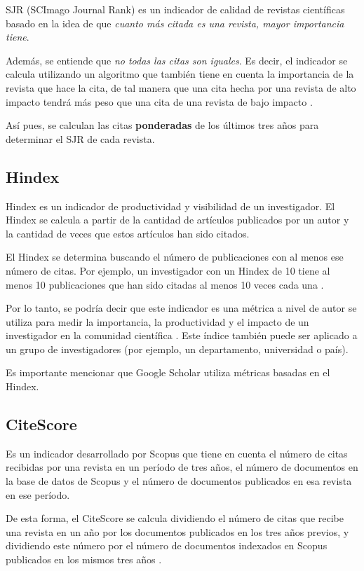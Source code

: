 SJR (SCImago Journal Rank) es un indicador de calidad de revistas científicas basado en la idea de que \textit{cuanto más citada es una revista, mayor importancia tiene}. 

Además, se entiende que \textit{no todas las citas son iguales}\cite{Svetla2022}. Es decir, el indicador se calcula utilizando un algoritmo que también tiene en cuenta la importancia de la revista que hace la cita, de tal manera que una cita hecha por una revista de alto impacto tendrá más peso que una cita de una revista de bajo impacto \cite{Svetla2022}. 

Así pues, se calculan las citas \textbf{ponderadas} de los últimos tres años para determinar el SJR de cada revista.

\subsection{Hindex}
Hindex es un indicador de productividad y visibilidad de un investigador. El Hindex se calcula a partir de la cantidad de artículos publicados por un autor y la cantidad de veces que estos artículos han sido citados. 

El Hindex se determina buscando el número de publicaciones con al menos ese número de citas. Por ejemplo, un investigador con un Hindex de 10 tiene al menos 10 publicaciones que han sido citadas al menos 10 veces cada una \cite{Svetla2022}. 

Por lo tanto, se podría decir que este indicador es una métrica a nivel de autor se utiliza para medir la importancia, la productividad y el impacto de un investigador en la comunidad científica \cite{Svetla2022}. Este índice también puede ser aplicado a un grupo de investigadores (por ejemplo, un departamento, universidad o país).

Es importante mencionar que Google Scholar utiliza métricas basadas en el Hindex.

\subsection{CiteScore}
Es un indicador desarrollado por Scopus que tiene en cuenta el número de citas recibidas por una revista en un período de tres años, el número de documentos en la base de datos de Scopus y el número de documentos publicados en esa revista en ese período.

De esta forma, el CiteScore se calcula dividiendo el número de citas que recibe una revista en un año por los documentos publicados en los tres años previos, y dividiendo este número por el número de documentos indexados en Scopus publicados en los mismos tres años \cite{Svetla2022}. 


